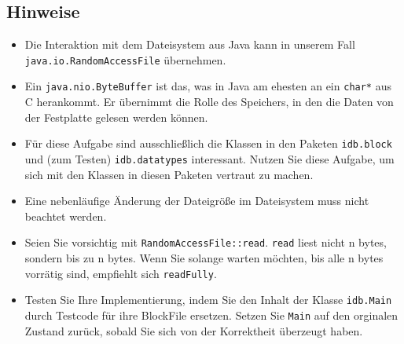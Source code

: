 \subsection{Hinweise}
\begin{itemize}
	\item Die Interaktion mit dem Dateisystem aus Java kann in unserem Fall \normaltxt{\linebreak}\texttt{java.io.RandomAccessFile} übernehmen.
	\item Ein \texttt{java.nio.ByteBuffer} ist das, was in Java am ehesten an ein \texttt{char*} aus C herankommt.
		Er übernimmt die Rolle des Speichers, in den die Daten von der Festplatte gelesen werden können.
	\item Für diese Aufgabe sind ausschließlich die Klassen in den Paketen \texttt{idb.block} und (zum Testen) \texttt{idb.datatypes} interessant.
		Nutzen Sie diese Aufgabe, um sich mit den Klassen in diesen Paketen vertraut zu machen.
	\item Eine nebenläufige Änderung der Dateigröße im Dateisystem muss nicht beachtet werden.
	\item Seien Sie vorsichtig mit \texttt{RandomAccessFile::read}. \texttt{read} liest nicht n bytes, sondern bis zu n bytes.
		Wenn Sie solange warten möchten, bis alle n bytes vorrätig sind, empfiehlt sich \texttt{readFully}.
	\item Testen Sie Ihre Implementierung, indem Sie den Inhalt der Klasse \texttt{idb.Main} durch Testcode für ihre BlockFile ersetzen.
		Setzen Sie \texttt{Main} auf den orginalen Zustand zurück, sobald Sie sich von der Korrektheit überzeugt haben.
\end{itemize}
